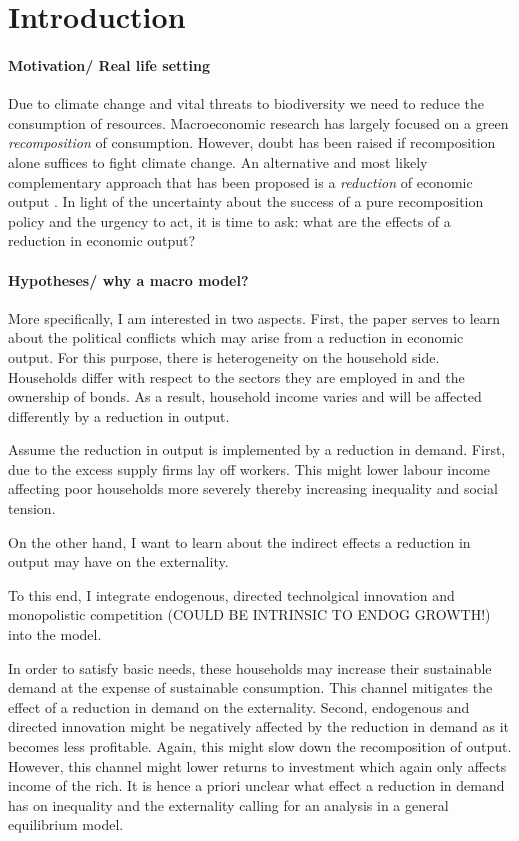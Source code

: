 \section{Introduction}

\paragraph{Motivation/ Real life setting}
Due to climate change and vital threats to biodiversity we need to reduce the consumption of resources. %
Macroeconomic research has largely focused on a green \textit{recomposition} of consumption. However, doubt has been raised if recomposition alone suffices to fight climate change. An alternative and most likely complementary approach that has been proposed is a \textit{reduction} of economic output \citep[e.g.][]{Dasgupta2021}. %
In light of the uncertainty about the success of a pure recomposition policy and the urgency to act, it is time to ask: what are the effects of a reduction in economic output? 

\paragraph{Hypotheses/ why a macro model?}
More specifically, I am interested in two aspects. First, the paper serves to learn about the political conflicts which may arise from a reduction in economic output. For this purpose, there is heterogeneity on the household side. 
Households differ with respect to the sectors they are employed in and the ownership of bonds. As a result, household income varies and will be affected differently by a reduction in output. 

Assume the reduction in output is implemented by a reduction in demand. First, due to the excess supply firms lay off workers. This might lower labour income affecting poor households more severely thereby increasing inequality and social tension.   

On the other hand, I want to learn about the indirect effects a reduction in output may have on the externality. 

To this end, I integrate  endogenous, directed technolgical innovation and monopolistic competition (COULD BE INTRINSIC TO ENDOG GROWTH!) into the model.


 In order to satisfy basic needs, these households may increase their sustainable demand at the expense of sustainable consumption. This channel mitigates the effect of a reduction in demand on the externality. 
Second, endogenous and directed innovation might be negatively affected by the reduction in demand as it becomes less profitable. Again, this might slow down the recomposition of output. However, this channel might lower returns to investment which again only affects income of the rich. 
It is hence a priori unclear what effect a reduction in demand has on inequality and the externality calling for an analysis in a general equilibrium model. 

